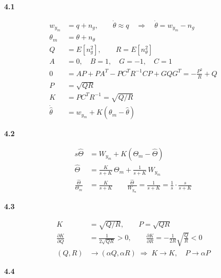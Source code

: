 \documentclass[11pt]{article}
\begin{document}
\textbf{4.1}

\begin{align*}
w_{y_m} &= q + n_g, \qquad \dot\theta \approx q
\quad\Rightarrow\quad \dot\theta = w_{y_m} - n_g\\
\theta_m &= \theta + n_\theta\\
Q &= E[n_g^2], \qquad R = E[n_\theta^2]\\[1ex]
A &= 0,\quad B = 1,\quad G = -1,\quad C = 1\\
0 &= AP + PA^T - PC^TR^{-1}CP + GQG^T = -\frac{P^2}{R} + Q\\
P &= \sqrt{QR}\\
K &= PC^TR^{-1} = \sqrt{Q/R}\\
\dot{\hat\theta} &= w_{y_m} + K(\theta_m - \hat\theta)
\end{align*}

\textbf{4.2}

\begin{align*}
s\hat\Theta &= W_{y_m} + K(\Theta_m - \hat\Theta)\\
\hat\Theta &= \frac{K}{s+K}\,\Theta_m + \frac{1}{s+K}\,W_{y_m}\\[1ex]
\frac{\hat\Theta}{\Theta_m} &= \frac{K}{s+K}
\qquad
\frac{\hat\Theta}{W_{y_m}} = \frac{1}{s+K} = \frac{1}{s}\cdot\frac{s}{s+K}
\end{align*}

\textbf{4.3}

\begin{align*}
K &= \sqrt{Q/R}, \qquad P = \sqrt{QR}\\
\frac{\partial K}{\partial Q} &= \frac{1}{2\sqrt{QR}} > 0, \qquad
\frac{\partial K}{\partial R} = -\frac{1}{2R}\sqrt{\frac{Q}{R}} < 0\\
(Q,R) &\to (\alpha Q,\alpha R) \;\Rightarrow\; K \to K, \quad P \to \alpha P
\end{align*}

\textbf{4.4}
\end{document}
